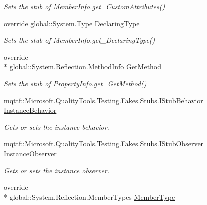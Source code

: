\begin{DoxyCompactItemize}
\begin{DoxyCompactList}\small\item\em Sets the stub of Member\-Info.\-get\-\_\-\-Custom\-Attributes()\end{DoxyCompactList}\item 
override global\-::\-System.\-Type \hyperlink{class_system_1_1_reflection_1_1_fakes_1_1_stub_property_info_a5abb823e05ef73b86a487dbc0a72fa02}{Declaring\-Type}
\begin{DoxyCompactList}\small\item\em Sets the stub of Member\-Info.\-get\-\_\-\-Declaring\-Type()\end{DoxyCompactList}\item 
override \\*
global\-::\-System.\-Reflection.\-Method\-Info \hyperlink{class_system_1_1_reflection_1_1_fakes_1_1_stub_property_info_a00b247caa9d8ba1c88a019d6ba951330}{Get\-Method}
\begin{DoxyCompactList}\small\item\em Sets the stub of Property\-Info.\-get\-\_\-\-Get\-Method()\end{DoxyCompactList}\item 
mqttf\-::\-Microsoft.\-Quality\-Tools.\-Testing.\-Fakes.\-Stubs.\-I\-Stub\-Behavior \hyperlink{class_system_1_1_reflection_1_1_fakes_1_1_stub_property_info_a97b33076b353c8e9baecc3d022469d11}{Instance\-Behavior}
\begin{DoxyCompactList}\small\item\em Gets or sets the instance behavior.\end{DoxyCompactList}\item 
mqttf\-::\-Microsoft.\-Quality\-Tools.\-Testing.\-Fakes.\-Stubs.\-I\-Stub\-Observer \hyperlink{class_system_1_1_reflection_1_1_fakes_1_1_stub_property_info_a391aace65725772c9e459cdc2eb104ef}{Instance\-Observer}
\begin{DoxyCompactList}\small\item\em Gets or sets the instance observer.\end{DoxyCompactList}\item 
override \\*
global\-::\-System.\-Reflection.\-Member\-Types \hyperlink{class_system_1_1_reflection_1_1_fakes_1_1_stub_property_info_aa3144d75622ae2110d96bec712d59506}{Member\-Type}

\end{DoxyCompactItemize}
